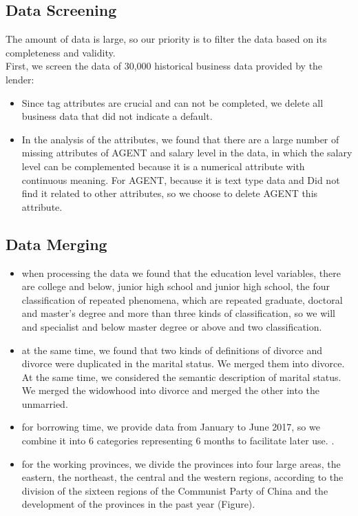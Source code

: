 \documentclass{mcmthesis}
\begin{document}
\subsection{Data Screening}
The amount of data is large, so our priority is to filter the data based on its completeness and validity.\\
First, we screen the data of 30,000 historical business data provided by the lender:\\
\begin{itemize}
\item Since tag attributes are crucial and can not be completed, we delete all business data that did not indicate a default.
\item In the analysis of the attributes, we found that there are a large number of missing attributes of AGENT and salary level in the data, in which the salary level can be complemented because it is a numerical attribute with continuous meaning. For AGENT, because it is text type data and Did not find it related to other attributes, so we choose to delete AGENT this attribute.
\end{itemize}

\subsection{Data Merging}
\begin{itemize}
\item when processing the data we found that the education level variables, there are college and below, junior high school and junior high school, the four classification of repeated phenomena, which are repeated graduate, doctoral and master's degree and more than three kinds of classification, so we will and specialist and below master degree or above and two classification.
\item at the same time, we found that two kinds of definitions of divorce and divorce were duplicated in the marital status. We merged them into divorce. At the same time, we considered the semantic description of marital status. We merged the widowhood into divorce and merged the other into the unmarried.
\item for borrowing time, we provide data from January to June 2017, so we combine it into 6 categories representing 6 months to facilitate later use. .
\item for the working provinces, we divide the provinces into four large areas, the eastern, the northeast, the central and the western regions, according to the division of the sixteen regions of the Communist Party of China and the development of the provinces in the past year (Figure).
\end{itemize}
\end{document}
